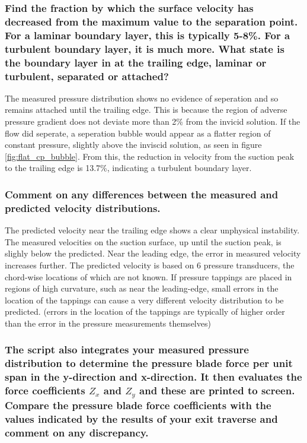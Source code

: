 \documentclass{article}
\begin{document}
\subsubsection{Find the fraction by which the surface velocity has decreased from the maximum value
to the separation point. For a laminar boundary layer, this is typically 5-8\%. For a turbulent
boundary layer, it is much more. What state is the boundary layer in at the trailing edge, laminar
or turbulent, separated or attached?}

The measured pressure distribution shows no evidence of seperation and so remains attached until the trailing edge.
This is because the region of adverse pressure gradient does not deviate more than 2\% from the invicid solution.
If the flow did seperate, a seperation bubble would appear as a flatter region of constant pressure, slightly above the inviscid solution, as seen in figure \ref{fig:flat_cp_bubble}.
From this, the reduction in velocity from the suction peak to the trailing edge is 13.7\%, indicating a turbulent boundary layer.


\subsubsection{Comment on any differences between the measured and predicted velocity
distributions.}

The predicted velocity near the trailing edge shows a clear unphysical instability.
The measured velocities on the suction surface, up until the suction peak, is slighly below the predicted.
Near the leading edge, the error in measured velocity increases further.
The predicted velocity is based on 6 pressure transducers, the chord-wise locations of which are not known.
If pressure tappings are placed in regions of high curvature, such as near the leading-edge, 
small errors in the location of the tappings can cause a very different velocity distribution to be predicted.
(errors in the location of the tappings are typically of higher order than the error in the pressure measurements themselves)

\subsubsection{The script also integrates your measured pressure distribution to determine the pressure
blade force per unit span in the y-direction and x-direction. It then evaluates the force
coefficients $Z_x$ and $Z_y$ and these are printed to screen.
Compare the pressure blade force coefficients with the values indicated by the results of your
exit traverse and comment on any discrepancy.}
\end{document}
